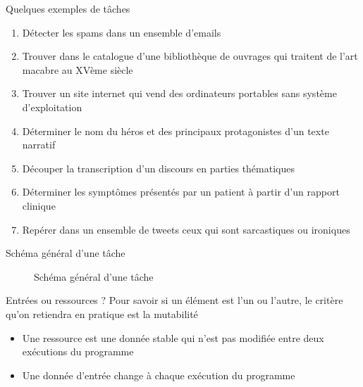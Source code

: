 \documentclass[hyperref={unicode}, xcolor={svgnames}, french]{beamer}
\begin{document}
\begin{frame}{Quelques exemples de tâches}
    \begin{enumerate}
        \item Détecter les spams dans un ensemble d'emails
        \item Trouver dans le catalogue d'une bibliothèque de ouvrages qui traitent de l'art macabre au XVème siècle
        \item Trouver un site internet qui vend des ordinateurs portables sans système d'exploitation
        \item Déterminer le nom du héros et des principaux protagonistes d'un texte narratif
        \item Découper la transcription d'un discours en parties thématiques
        \item Déterminer les symptômes présentés par un patient à partir d'un rapport clinique
        \item Repérer dans un ensemble de tweets ceux qui sont sarcastiques ou ironiques
    \end{enumerate}
\end{frame}

\begin{frame}[fragile]{Schéma général d'une tâche}
    \begin{figure}
        \tikzset{external/export=true}
        \caption{Schéma général d'une tâche}
    \end{figure}
\end{frame}

\begin{frame}{Entrées ou ressources ?}
    Pour savoir si un élément est l'un ou l'autre, le critère qu'on retiendra en pratique est la \alert{mutabilité}
    \begin{itemize}
        \item Une ressource est une donnée stable qui n'est pas modifiée entre deux exécutions du programme
        \item Une donnée d'entrée change à chaque exécution du programme
    \end{itemize}
\end{frame}
\end{document}
